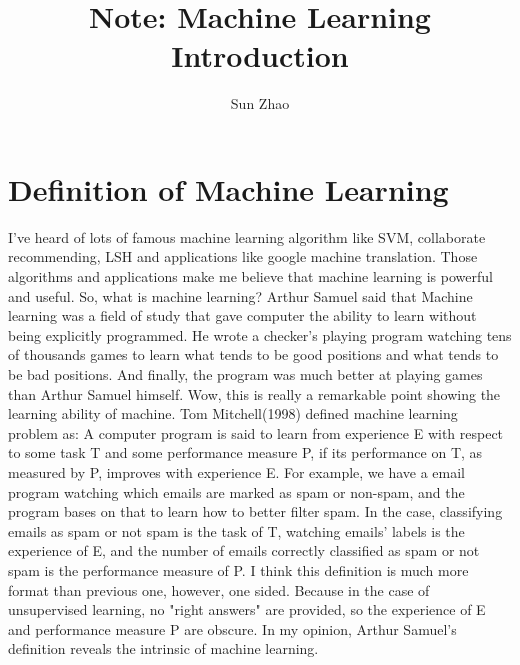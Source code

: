 \documentclass{article}
\title{Note: Machine Learning Introduction}
\author{Sun Zhao}
\begin{document}
\maketitle
\newpage

\section{Definition of Machine Learning}
I've heard of lots of famous machine learning algorithm like SVM, collaborate recommending, LSH and applications like google machine translation. Those algorithms and applications make me believe that machine learning is powerful and useful. So, what is machine learning? Arthur Samuel said that Machine learning was a field of study that gave computer the ability to learn without being explicitly programmed. He wrote a checker's playing program watching tens of thousands games to learn what tends to be good positions and what tends to be bad positions. And finally, the program was much better at playing games than Arthur Samuel himself. Wow, this is really a remarkable point showing the learning ability of machine. Tom Mitchell(1998) defined machine learning problem as: A computer program is said to learn from experience E with respect to some task T and some performance measure P, if its performance on T, as measured by P, improves with experience E. For example, we have a email program watching which emails are marked as spam or non-spam, and the program bases on that to learn how to better filter spam. In the case, classifying emails as spam or not spam is the task of T, watching emails' labels is the experience of E, and the number of emails correctly classified as spam or not spam is the performance measure of P. I think this definition is much more format than previous one, however, one sided. Because in the case of unsupervised learning, no "right answers" are provided, so the experience of E and performance measure P are obscure. In my opinion, Arthur Samuel's definition reveals the intrinsic of machine learning.
\end{document}
